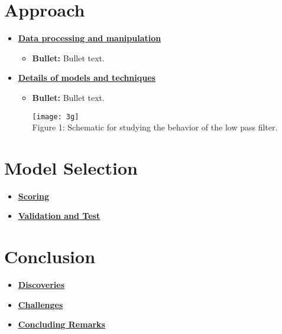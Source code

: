 \documentclass[11pt]{article}
\newcommand{\boldline}[1]{\underline{\textbf{#1}}}
\begin{document}
	
	
	\section{Approach}
	\medskip
	\begin{itemize}
		
		\item \boldline{Data processing and manipulation}
		\begin{itemize}
			\item \textbf{Bullet:} Bullet text.
		\end{itemize}
		
		\item \boldline{Details of models and techniques}
		\begin{itemize}
			\item \textbf{Bullet:} Bullet text.
			
			\begin{center}
				\texttt{[image: 3g]}\\
				Figure 1: Schematic for studying the behavior of the low pass filter.
			\end{center}
			
		\end{itemize}
		
	\end{itemize}
	
	
	
	\section{Model Selection}
	\medskip
	\begin{itemize}
		
		\item \boldline{Scoring} \\
		
		\item \boldline{Validation and Test} \\
		
	\end{itemize}
	
	
	
	\section{Conclusion}
	\medskip
	\begin{itemize}
		
		\item \boldline{Discoveries} \\
		
		\item \boldline{Challenges} \\
		
		\item \boldline{Concluding Remarks} \\
		
	\end{itemize}
	
	
	
\end{document}
